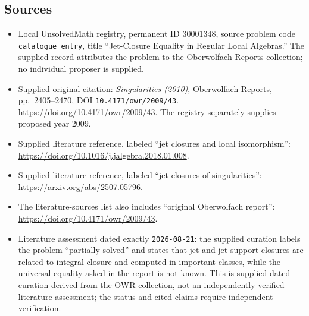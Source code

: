 \documentclass[11pt]{article}
\begin{document}
\subsection{Sources}
\begin{itemize}
\item Local UnsolvedMath registry, permanent ID \(30001348\), source problem code \texttt{catalogue entry}, title ``Jet-Closure Equality in Regular Local Algebras.'' The supplied record attributes the problem to the Oberwolfach Reports collection; no individual proposer is supplied.
\item Supplied original citation: \emph{Singularities (2010)}, Oberwolfach Reports, pp.~2405--2470, DOI \texttt{10.4171/owr/2009/43}. \url{https://doi.org/10.4171/owr/2009/43}. The registry separately supplies proposed year \(2009\).
\item Supplied literature reference, labeled ``jet closures and local isomorphism'': \url{https://doi.org/10.1016/j.jalgebra.2018.01.008}.
\item Supplied literature reference, labeled ``jet closures of singularities'': \url{https://arxiv.org/abs/2507.05796}.
\item The literature-sources list also includes ``original Oberwolfach report'': \url{https://doi.org/10.4171/owr/2009/43}.
\item Literature assessment dated exactly \texttt{2026-08-21}: the supplied curation labels the problem ``partially solved'' and states that jet and jet-support closures are related to integral closure and computed in important classes, while the universal equality asked in the report is not known. This is supplied dated curation derived from the OWR collection, not an independently verified literature assessment; the status and cited claims require independent verification.
\end{itemize}
\end{document}
